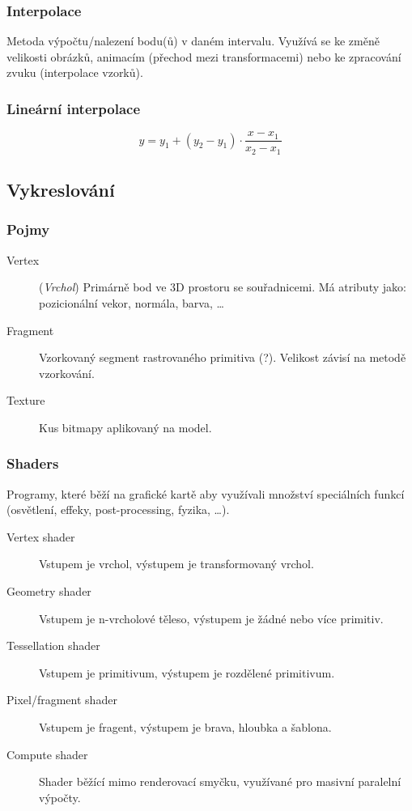 \subsubsection*{Interpolace}

Metoda výpočtu/nalezení bodu(ů) v daném intervalu.
Využívá se ke změně velikosti obrázků, animacím (přechod mezi transformacemi) nebo ke zpracování zvuku (interpolace vzorků).

\subsubsection*{Lineární interpolace}

\[
    y = y_1 + (y_2 - y_1) \cdot \frac{x-x_1}{x_2-x_1}
\]


\subsection*{Vykreslování}

\medskip

\subsubsection*{Pojmy}

\begin{description}
    \item[Vertex] (\textit{Vrchol}) Primárně bod ve 3D prostoru se souřadnicemi. Má atributy jako: pozicionální vekor, normála, barva, \dots
    \item[Fragment] Vzorkovaný segment rastrovaného primitiva (?). Velikost závisí na metodě vzorkování.
    \item[Texture] Kus bitmapy aplikovaný na model.
\end{description}

\subsubsection*{Shaders}

Programy, které běží na grafické kartě aby využívali množství speciálních funkcí (osvětlení, effeky, post-processing, fyzika, \dots).

\begin{description}
    \item[Vertex shader] Vstupem je vrchol, výstupem je transformovaný vrchol.
    \item[Geometry shader] Vstupem je n-vrcholové těleso, výstupem je žádné nebo více primitiv.
    \item[Tessellation shader] Vstupem je primitivum, výstupem je rozdělené primitivum.
    \item[Pixel/fragment shader] Vstupem je fragent, výstupem je brava, hloubka a šablona.
    \item[Compute shader] Shader běžící mimo renderovací smyčku, využívané pro masivní paralelní výpočty.
\end{description}


